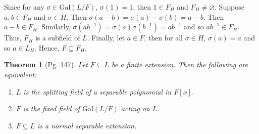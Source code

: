 \documentclass[leqno]{article}
\makeatletter
\newtheorem{theorem}{Theorem}
\theoremstyle{definition}
\theoremstyle{remark}
\let\oldproofname=\proofname
\renewcommand{\proofname}{\textit{\oldproofname}}
\theoremstyle{definition}
\renewenvironment{proof}[1][\proofname]{\par
  \pushQED{\qed}%
  \normalfont \topsep6\p@\@plus6\p@\relax
  \list{}{\leftmargin=0mm
          \rightmargin=0mm
          \settowidth{\itemindent}{\itshape#1}%
          \labelwidth=\itemindent
          \parsep=0pt \listparindent=0mm%
  }
  \item[\hskip\labelsep
        \itshape
    #1\@addpunct{.}]\ignorespaces
}{%
  \popQED\endlist\@endpefalse
}
\makeatother
\begin{document}
        \begin{proof}
            Since for any $\sigma\in\text{Gal}(L/F)$, $\sigma(1)=1$, then $1\in F_H$ and $F_H\neq\varnothing$. Suppose $a,b\in F_H$ and $\sigma\in H$. Then $\sigma(a-b)=\sigma(a)-\sigma(b)=a-b$. Then $a-b\in F_H$. Similarly, $\sigma(ab^{-1})=\sigma(a)\sigma(b^{-1})=ab^{-1}$ and so $ab^{-1}\in F_H$. Thus, $F_H$ is a subfield of $L$. Finally, let $a\in F$, then for all $\sigma\in H$, $\sigma(a)=a$ and so $a\in L_H$. Hence, $F\subseteq F_H$. 
        \end{proof}
    \begin{theorem}[Pg. 147]\label{thm:8}
        Let $F\subseteq L$ be a finite extension. Then the following are equivalent:
            \begin{enumerate}[label=\normalfont{(\alph*)}]
                \item $L$ is the splitting field of a separable polynomial in $F[x]$.
                \item $F$ is the fixed field of $\text{Gal}(L/F)$ acting on $L$.
                \item $F\subseteq L$ is a normal separable extension.
            \end{enumerate}
    \end{theorem}
\end{document}
